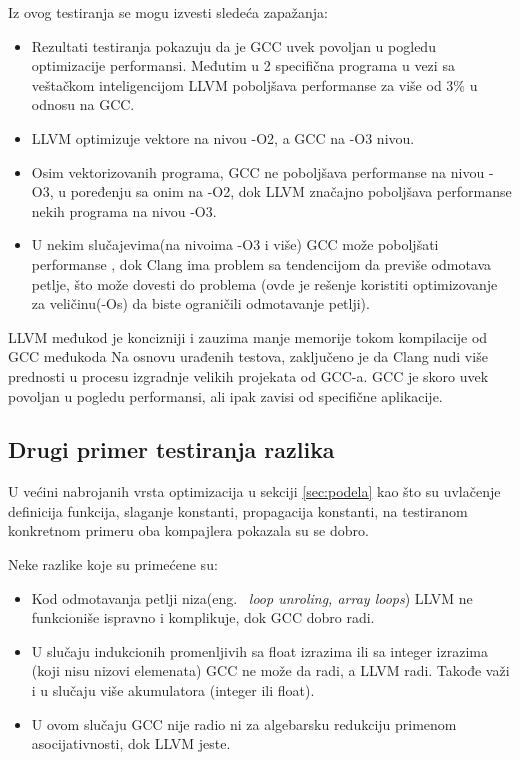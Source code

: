\documentclass[a4paper]{article}
\begin{document}
Iz ovog testiranja se mogu izvesti sledeća zapažanja: 

\begin{itemize} 
\item Rezultati testiranja pokazuju da je GCC uvek povoljan u pogledu optimizacije performansi. 
Međutim u 2 specifična programa u vezi sa veštačkom inteligencijom LLVM poboljšava performanse za više od 3\% u odnosu na GCC. 
\item LLVM optimizuje vektore na nivou -O2,  a GCC na -O3 nivou. 
\item Osim vektorizovanih programa, GCC ne poboljšava performanse na nivou -O3, u poređenju sa onim na -O2, dok LLVM značajno poboljšava performanse nekih programa na nivou -O3. 
\item U nekim slučajevima(na nivoima -O3 i više) GCC može poboljšati performanse , dok Clang ima problem sa tendencijom da previše odmotava petlje, što može dovesti do problema (ovde je rešenje koristiti optimizovanje za veličinu(-Os) da biste ograničili odmotavanje petlji).
\end{itemize}

LLVM međukod je koncizniji i zauzima manje memorije tokom kompilacije od GCC međukoda
Na osnovu urađenih testova, zaključeno je da Clang nudi više prednosti u procesu izgradnje velikih projekata od GCC-a. 
GCC je skoro uvek povoljan u pogledu performansi, ali ipak zavisi od specifične aplikacije. \cite{gccVsClang} 

\subsection{Drugi primer testiranja razlika}
\label{subsec:primer1}

U većini nabrojanih  vrsta optimizacija u sekciji \ref{sec:podela} kao što su uvlačenje definicija funkcija, slaganje konstanti, propagacija konstanti, na testiranom konkretnom primeru oba kompajlera pokazala su se dobro.

Neke razlike koje su primećene su: 
\begin{itemize}
\item Kod odmotavanja petlji niza(eng. ~{\em loop unroling, array loops}) LLVM ne funkcioniše ispravno i komplikuje, dok GCC dobro radi. 
\item U slučaju indukcionih promenljivih sa float izrazima  ili sa integer izrazima (koji nisu nizovi elemenata) GCC ne može da radi, a LLVM radi. Takođe važi i u slučaju više akumulatora (integer ili float).
\item U ovom slučaju GCC nije radio ni za algebarsku redukciju primenom asocijativnosti, dok LLVM jeste. \cite{fogOptimizacije}
\end{itemize}
\end{document}
